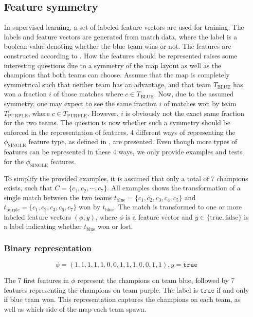\subsection{Feature symmetry}
\label{sec:representationoffeatures}
In supervised learning, a set of labeled feature vectors are used for training.
The labels and feature vectors are generated from match data, where the label is a boolean value denoting whether the blue team wins or not.
The features are constructed according to .
How the features should be represented raises some interesting questions due to a symmetry of the map layout as well as the champions that both teams can choose. Assume that the map is completely symmetrical such that neither team has an advantage, and that team $T_\text{BLUE}$ has won a fraction $i$ of those matches where $c \in T_\text{BLUE}$.
Now, due to the assumed symmetry, one may expect to see the same fraction $i$ of matches won by team $T_\text{PURPLE}$, where $c \in T_\text{PURPLE}$.
However, $i$ is obviously not the exact same fraction for the two teams. The question is now whether such a symmetry should be enforced in the representation of features.
4 different ways of representing the $\phi_\text{SINGLE}$ feature type, as defined in , are presented.
Even though more types of features can be represented in these 4 ways, we only provide examples and tests for the $\phi_\text{SINGLE}$ features.

To simplify the provided examples, it is assumed that only a total of 7 champions exists, such that $C = \{c_1, c_2, \cdots, c_7\}$.
All examples shows the transformation of a single match between the two teams $t_\text{blue} = \{c_1,c_2,c_3,c_4,c_5\}$ and $t_\text{purple} = \{c_1,c_2,c_3,c_6,c_7\}$ won by $t_\text{blue}$. The match is transformed to one or more labeled feature vectors $(\phi, y)$, where $\phi$ is a feature vector and $y \in \{\text{true}, \text{false}\}$ is a label indicating whether $t_\text{blue}$ won or lost.

\subsubsection{Binary representation}

\[ \phi = (1,1,1,1,1,0,0,1,1,1,0,0,1,1), y = \texttt{true} \]

The 7 first features in $\phi$ represent the champions on team blue, followed by 7 features representing the champions on team purple. The label is $\texttt{true}$ if and only if blue team won.
This representation captures the champions on each team, as well as which side of the map each team spawn.

